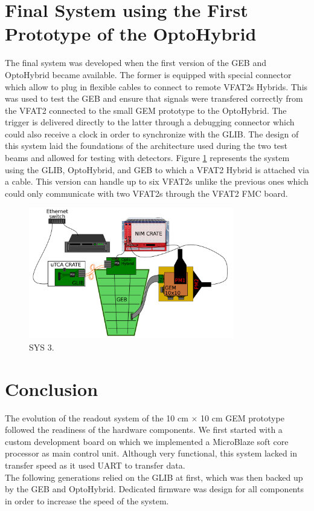   \section{Final System using the First Prototype of the OptoHybrid}

    The final system was developed when the first version of the GEB and OptoHybrid became available. The former is equipped with special connector which allow to plug in flexible cables to connect to remote VFAT2s Hybrids. This was used to test the GEB and ensure that signals were transfered correctly from the VFAT2 connected to the small GEM prototype to the OptoHybrid. The trigger is delivered directly to the latter through a debugging connector which could also receive a clock in order to synchronize with the GLIB. The design of this system laid the foundations of the architecture used during the two test beams and allowed for testing with detectors. Figure \ref{fig:III-1-sys-3} represents the system using the GLIB, OptoHybrid, and GEB to which a VFAT2 Hybrid is attached via a cable. This version can handle up to six VFAT2s unlike the previous ones which could only communicate with two VFAT2s through the VFAT2 FMC board.

    \begin{figure}[h!]
      \centering
      \includegraphics[width=0.8\textwidth]{img/III-1-arch/sys_3.png}
      \caption{SYS 3.}
      \label{fig:III-1-sys-3}
    \end{figure}

  \section{Conclusion}

    The evolution of the readout system of the 10 cm $ \times $ 10 cm GEM prototype followed the readiness of the hardware components. We first started with a custom development board on which we implemented a MicroBlaze soft core processor as main control unit. Although very functional, this system lacked in transfer speed as it used UART to transfer data. \\

    The following generations relied on the GLIB at first, which was then backed up by the GEB and OptoHybrid. Dedicated firmware was design for all components in order to increase the speed of the system. 
